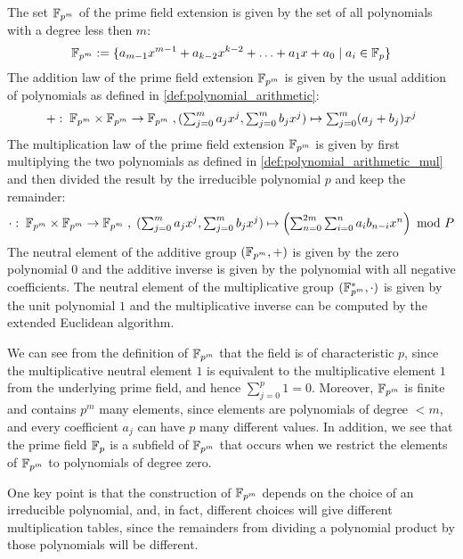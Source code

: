 The set $\mathbb{F}_{p^m}$ of the prime field extension is given by the set of all polynomials with a degree less then $m$:
\begin{equation}
\label{eq:prime-extension-field}
\mathbb{F}_{p^m}:= \{a_{m-1} x^{m-1}+a_{k-2}x^{k-2}+\ldots+a_1 x+a_0\;|\; a_i\in \mathbb{F}_p\}
\end{equation}
The addition law of the prime field extension $\mathbb{F}_{p^m}$ is given by the usual addition of polynomials as defined in \ref{def:polynomial_arithmetic}: 
\begin{equation}
+:\; \mathbb{F}_{p^m}\times \mathbb{F}_{p^m} \to \mathbb{F}_{p^m}\; , \textstyle (\sum_{j=0}^m a_j x^j,\sum_{j=0}^m b_j x^j)\mapsto \sum_{j=0}^m (a_j+b_j) x^j
\end{equation}
The multiplication law of the prime field extension $\mathbb{F}_{p^m}$ is given by first multiplying the two polynomials as defined in \ref{def:polynomial_arithmetic_mul} and then divided the result by the irreducible polynomial $p$ and keep the remainder:
\begin{equation}
\cdot : \; \mathbb{F}_{p^m}\times \mathbb{F}_{p^m} \to \mathbb{F}_{p^m}\; , \textstyle\; (\sum_{j=0}^m a_j x^j,\sum_{j=0}^m b_j x^j)\mapsto \left(\sum _{n = 0} ^{2m} \sum _{i = 0} ^{n}{a} _{i }{{b} _{n-i}}{x} ^{n}\right) \text{ mod } P
\end{equation}
The neutral element of the additive group $(\mathbb{F}_{p^m},+)$ is given by the zero polynomial $0$ and the additive inverse is given by the polynomial with all negative coefficients. The neutral element of the multiplicative group $(\mathbb{F}^*_{p^m},\cdot)$ is given by the unit polynomial $1$ and the multiplicative inverse can be computed by the extended Euclidean algorithm.

We can see from the definition of $\mathbb{F}_{p^m}$ that the field is of characteristic $p$, since the multiplicative neutral element $1$ is equivalent to the multiplicative element $1$ from the underlying prime field, and hence $\sum_{j=0}^p 1=0$. Moreover, $\mathbb{F}_{p^m}$ is finite and contains $p^m$ many elements, since elements are polynomials of degree $<m$, and every coefficient $a_j$ can have $p$ many different values. In addition, we see that the prime field $\mathbb{F}_p$ is a subfield of $\mathbb{F}_{p^m}$ that occurs when we restrict the elements of $\mathbb{F}_{p^m}$ to polynomials of degree zero.

One key point is that the construction of $\mathbb{F}_{p^m}$ depends on the choice of an irreducible polynomial, and, in fact, different choices will give different multiplication tables, since the remainders from dividing a polynomial product by those polynomials will be different.

